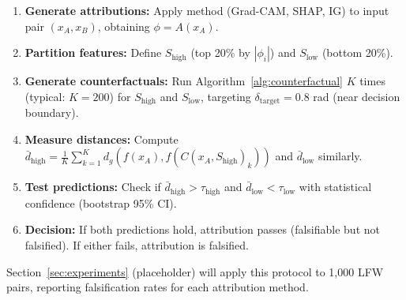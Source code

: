 \begin{enumerate}
\item \textbf{Generate attributions:} Apply method (Grad-CAM, SHAP, IG) to input pair $(x_A, x_B)$, obtaining $\phi = A(x_A)$.

\item \textbf{Partition features:} Define $S_{\text{high}}$ (top 20\% by $|\phi_i|$) and $S_{\text{low}}$ (bottom 20\%).

\item \textbf{Generate counterfactuals:} Run Algorithm~\ref{alg:counterfactual} $K$ times (typical: $K = 200$) for $S_{\text{high}}$ and $S_{\text{low}}$, targeting $\delta_{\text{target}} = 0.8$ rad (near decision boundary).

\item \textbf{Measure distances:} Compute $\bar{d}_{\text{high}} = \frac{1}{K} \sum_{k=1}^K d_g(f(x_A), f(C(x_A, S_{\text{high}})_k))$ and $\bar{d}_{\text{low}}$ similarly.

\item \textbf{Test predictions:} Check if $\bar{d}_{\text{high}} > \tau_{\text{high}}$ and $\bar{d}_{\text{low}} < \tau_{\text{low}}$ with statistical confidence (bootstrap 95\% CI).

\item \textbf{Decision:} If both predictions hold, attribution passes (falsifiable but not falsified). If either fails, attribution is falsified.
\end{enumerate}

Section~\ref{sec:experiments} (placeholder) will apply this protocol to 1,000 LFW pairs, reporting falsification rates for each attribution method.
